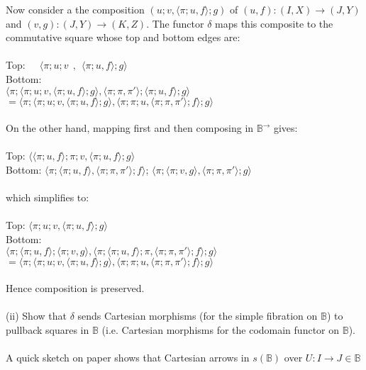 \documentclass{article}
\begin{document}
Now consider a the composition $(u;v, \langle \pi;u , f \rangle; g)$ of $(u,f) : (I,X) \to (J, Y)$ 
and $(v,g) : (J, Y) \to (K,Z)$. The functor $\delta$ maps this composite to the commutative square whose 
top and bottom edges are:\\~\\
Top: $~~~~~\langle \pi;u;v~~,~~\langle \pi;u , f \rangle; g \rangle$\\
Bottom:\\$\langle \pi; \langle \pi;u;v, \langle \pi;u , f \rangle; g \rangle, \langle \pi;\pi, \pi' \rangle; \langle \pi;u, f \rangle; g \rangle$\\
$= \langle \pi; \langle \pi;u;v, \langle \pi;u , f \rangle; g \rangle, \langle \pi;\pi;u, \langle \pi;\pi, \pi' \rangle; f \rangle; g \rangle$\\~\\
On the other hand, mapping first and then composing in $\mathbb B^{\to}$ gives:\\~\\
Top: $\langle \langle \pi;u, f \rangle; \pi; v, \langle \pi;u, f \rangle;g \rangle$\\
Bottom: $\langle \pi;\langle \pi;u , f \rangle, \langle \pi;\pi, \pi' \rangle; f \rangle$;
$\langle \pi;\langle \pi;v , g \rangle, \langle \pi;\pi, \pi' \rangle; g \rangle$\\~\\
which simplifies to: \\~\\
Top: $\langle \pi;u;v , \langle \pi;u, f \rangle;g \rangle$\\
Bottom:\\$\langle \pi; \langle \pi;u, f \rangle; \langle \pi;v, g \rangle, \langle \pi;\langle\pi;u, f \rangle;\pi, 
\langle \pi;\pi, \pi' \rangle;f \rangle;g \rangle$\\
$= \langle \pi; \langle \pi;u;v, \langle \pi;u, f \rangle;g \rangle, \langle \pi;\pi;u, 
\langle \pi;\pi, \pi' \rangle;f \rangle;g \rangle$
\\~\\
Hence composition is preserved.\\~\\
(ii) Show that $\delta$ sends Cartesian morphisms (for the simple fibration on $\mathbb B$) to pullback squares in 
$\mathbb B$ (i.e. Cartesian morphisms for the codomain functor on $\mathbb B$).\\~\\
A quick sketch on paper shows that Cartesian arrows in $s(\mathbb B)$ over $U : I \to J \in \mathbb B$ 
\end{document}
